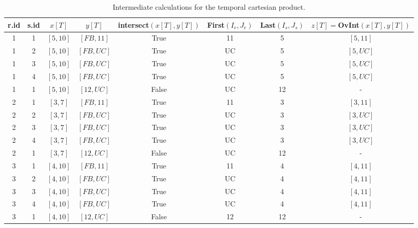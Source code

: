\documentclass{llncs}
\begin{document}
\begin{table}
\centering
\caption{Intermediate calculations for the temporal cartesian product.}

\begin{tabular}{c c c c c c c c}
\hline
r.id & s.id & $x\left[T\right]$ & $y\left[T\right]$ & intersect$\left(x\left[T\right], y\left[T\right]\right)$ & First$\left(I_e, J_e \right)$& Last$\left( I_s, J_s \right)$ &$z\left[T \right] = $OvInt$\left(x\left[T\right], y\left[T\right] \right) $  \\ \hline
1 & 1 & $\left[5, 10 \right]$  & $\left[FB, 11 \right]$  & True  & 11 &  5 & $\left[5, 11 \right]$ \\
1 & 2 & $\left[5, 10 \right]$  & $\left[FB, UC \right]$  & True  & UC &  5 & $\left[5, UC \right]$ \\
1 & 3 & $\left[5, 10 \right]$  & $\left[FB, UC \right]$  & True  & UC &  5 & $\left[5, UC \right]$ \\
1 & 4 & $\left[5, 10 \right]$  & $\left[FB, UC \right]$  & True  & UC &  5 & $\left[5, UC \right]$ \\
1 & 1 & $\left[5, 10 \right]$  & $\left[12, UC \right]$  & False & UC & 12 & -                     \\
2 & 1 & $\left[3, 7 \right]$   & $\left[FB, 11 \right]$  & True  & 11 &  3 & $\left[3, 11 \right]$ \\
2 & 2 & $\left[3, 7 \right]$   & $\left[FB, UC \right]$  & True  & UC &  3 & $\left[3, UC \right]$ \\
2 & 3 & $\left[3, 7 \right]$   & $\left[FB, UC \right]$  & True  & UC &  3 & $\left[3, UC \right]$ \\
2 & 4 & $\left[3, 7 \right]$   & $\left[FB, UC \right]$  & True  & UC &  3 & $\left[3, UC \right]$ \\
2 & 1 & $\left[3, 7 \right]$   & $\left[12, UC \right]$  & False & UC & 12 &  -                    \\
3 & 1 & $\left[4, 10 \right]$  & $\left[FB, 11 \right]$  & True  & 11 &  4 & $\left[4, 11 \right]$ \\
3 & 2 & $\left[4, 10 \right]$  & $\left[FB, UC \right]$  & True  & UC &  4 & $\left[4, 11 \right]$ \\
3 & 3 &  $\left[4, 10 \right]$ & $\left[FB, UC \right]$  & True  & UC &  4 & $\left[4, 11 \right]$ \\
3 & 4 & $\left[4, 10 \right]$  & $\left[FB, UC \right]$  & True  & UC &  4 & $\left[4, 11 \right]$ \\
3 & 1 & $\left[4, 10 \right]$  & $\left[12, UC \right]$  & False & 12 & 12 & -                     \\

\end{tabular}
\end{table}
\end{document}
